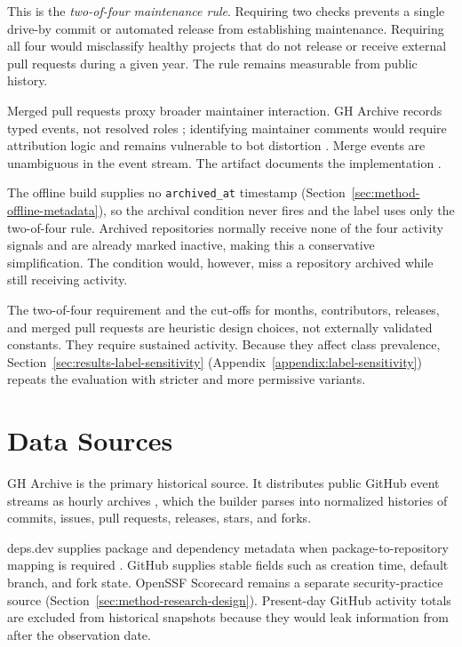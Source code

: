 This is the \emph{two-of-four maintenance rule}. Requiring two checks prevents a
single drive-by commit or automated release from establishing maintenance.
Requiring all four would misclassify healthy projects that do not release or
receive external pull requests during a given year. The rule remains measurable
from public history.

Merged pull requests proxy broader maintainer interaction. GH Archive records
typed events, not resolved roles \cite{gharchive}; identifying maintainer
comments would require attribution logic and remains vulnerable to bot
distortion \cite{hasan2023firstresponse}. Merge events are unambiguous in the
event stream. The artifact documents the implementation
\cite{ossRiskRadarDatasetBuilder}.

The offline build supplies no \texttt{archived\_at} timestamp
(Section~\ref{sec:method-offline-metadata}), so the archival condition never
fires and the label uses only the two-of-four rule. Archived repositories
normally receive none of the four activity signals and are already marked
inactive, making this a conservative simplification. The condition would,
however, miss a repository archived while still receiving activity.

The two-of-four requirement and the cut-offs for months, contributors, releases,
and merged pull requests are heuristic design choices, not externally validated
constants. They require sustained activity. Because they affect class
prevalence, Section~\ref{sec:results-label-sensitivity}
(Appendix~\ref{appendix:label-sensitivity}) repeats the evaluation with stricter
and more permissive variants.

\section{Data Sources}
\label{sec:method-data-sources}

GH Archive is the primary historical source. It distributes public GitHub event
streams as hourly archives \cite{gharchive}, which the builder parses into
normalized histories of commits, issues, pull requests, releases, stars, and
forks.

deps.dev supplies package and dependency metadata when package-to-repository
mapping is required \cite{depsdevApi}. GitHub supplies stable fields such as
creation time, default branch, and fork state. OpenSSF Scorecard remains a
separate security-practice source \cite{zahan2023scorecard}
(Section~\ref{sec:method-research-design}). Present-day GitHub activity totals
are excluded from historical snapshots because they would leak information from
after the observation date.

